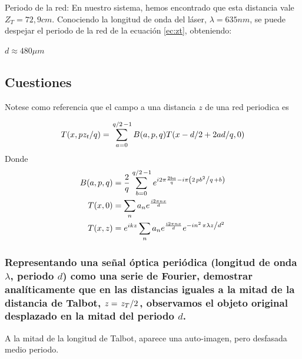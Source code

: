 \documentclass{./packages/optica-article}
\begin{document}
Periodo de la red:
En nuestro sistema, hemos encontrado que esta distancia vale $Z_T = 72,9 cm$. Conociendo la longitud de onda del láser, $\lambda = 635 nm$, se puede despejar el periodo de la red de la ecuación \ref{ec:zt}, obteniendo:
\begin{center}
	$d \approx 480 \mu m$
\end{center}


\subsection{Cuestiones}

Notese como referencia que el campo a una distancia $z$ de una red periodica es

\begin{equation}\label{eq:talbot}
	T(x, p z_t / q ) = \sum_{a=0}^{\flatfrac q 2 - 1} B(a, p, q) T (x - d/2 + 2ad/q, 0)
\end{equation}
Donde
\begin{align}
	\label{eq:talbot:t}
	B(a,p,q) & = \frac 2 q \sum_{b=0}^{\flatfrac q 2 - 1} e^{i 2 \pi \frac{2ba}{q} - i\pi \left(2 \flatfrac{p b^2}{q} + b\right)} \\
	T(x,0)   & =
	\sum_{n} a_n e^{\frac{i 2 \pi n x} {d}}\\
	T(x,z)   & =
	e^{ikz}
	\sum_{n} a_n e^{\frac{i 2 \pi n x} {d}} e^{- i n^2 \flatfrac{ \pi \lambda z } {d^2}}
\end{align}

\subsubsection{Representando una señal óptica periódica (longitud de onda $\lambda$, periodo $d$) como una serie de Fourier, demostrar analíticamente que en las distancias iguales a la mitad de la distancia de Talbot, $z=\flatfrac{z_{T}}{2}$, observamos el objeto original desplazado en la mitad del periodo $d$.}


	      A la mitad de la longitud de Talbot, aparece una auto-imagen, pero desfasada medio periodo.
\end{document}
